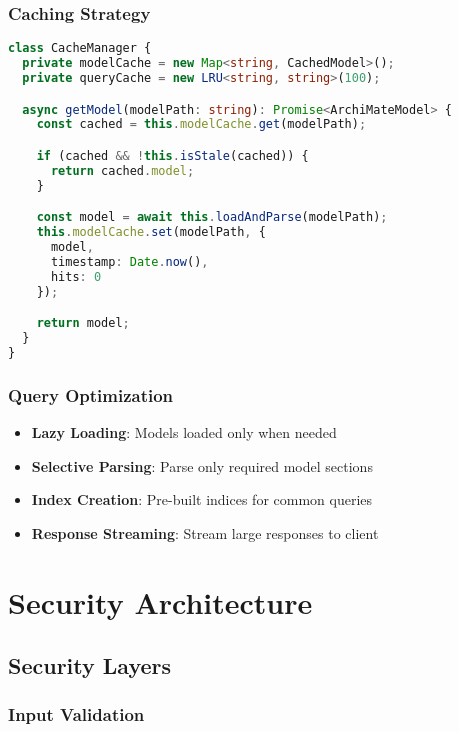\documentclass[12pt,a4paper]{report}
\begin{document}
\subsection{Caching Strategy}

\begin{lstlisting}[language=TypeScript, caption=Caching Implementation]
class CacheManager {
  private modelCache = new Map<string, CachedModel>();
  private queryCache = new LRU<string, string>(100);

  async getModel(modelPath: string): Promise<ArchiMateModel> {
    const cached = this.modelCache.get(modelPath);

    if (cached && !this.isStale(cached)) {
      return cached.model;
    }

    const model = await this.loadAndParse(modelPath);
    this.modelCache.set(modelPath, {
      model,
      timestamp: Date.now(),
      hits: 0
    });

    return model;
  }
}
\end{lstlisting}

\subsection{Query Optimization}

\begin{itemize}
    \item \textbf{Lazy Loading}: Models loaded only when needed
    \item \textbf{Selective Parsing}: Parse only required model sections
    \item \textbf{Index Creation}: Pre-built indices for common queries
    \item \textbf{Response Streaming}: Stream large responses to client
\end{itemize}

\chapter{Security Architecture}

\section{Security Layers}

\subsection{Input Validation}
\end{document}
